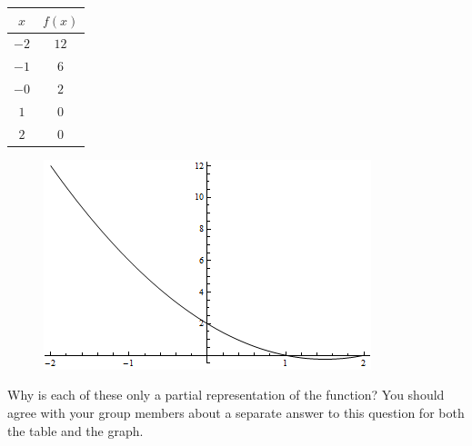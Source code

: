 \documentclass[justified]{tufte-handout}
\begin{document}
\begin{marginnote}
	\begin{table}
	\begin{tabular}{|c|c|}
		\hline
		$x$& $f(x)$  \\ \hline
		$-2$ & $12$      \\ \hline
		$-1$ & $6$  \\ \hline
		$-0$ & $2$  \\ \hline
		$1$  & $0$  \\ \hline
		$2$  & $0$  \\ \hline
		\end{tabular}
	\end{table}
\end{marginnote}
\begin{figure}
	\begin{center}
		\includegraphics[width=\textwidth]{ch11se01-fig1}
	\end{center}
\end{figure}
\begin{marginnote}
Why is each of these only a partial representation of the function? You should agree with your group members about a separate answer to this question for both the table and the graph.
\end{marginnote}
\end{document}
